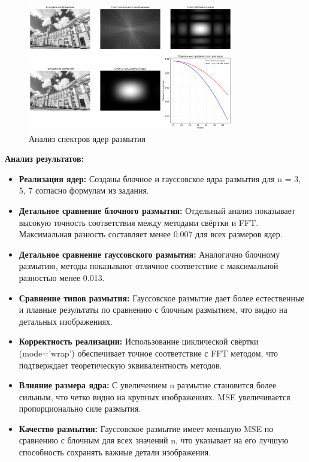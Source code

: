 \begin{figure}[H]
    \centering
    \includegraphics[width=0.8\textwidth]{images/task2/spectrum_analysis.png}
    \caption{Анализ спектров ядер размытия}
    \label{fig:spectrum_analysis_blur}
\end{figure}

\textbf{Анализ результатов:}
\begin{itemize}
    \item \textbf{Реализация ядер:} Созданы блочное и гауссовское ядра размытия для n = 3, 5, 7 согласно формулам из задания.
    
    \item \textbf{Детальное сравнение блочного размытия:} Отдельный анализ показывает высокую точность соответствия между методами свёртки и FFT. Максимальная разность составляет менее 0.007 для всех размеров ядер.
    
    \item \textbf{Детальное сравнение гауссовского размытия:} Аналогично блочному размытию, методы показывают отличное соответствие с максимальной разностью менее 0.013.
    
    \item \textbf{Сравнение типов размытия:} Гауссовское размытие дает более естественные и плавные результаты по сравнению с блочным размытием, что видно на детальных изображениях.
    
    \item \textbf{Корректность реализации:} Использование циклической свёртки (mode='wrap') обеспечивает точное соответствие с FFT методом, что подтверждает теоретическую эквивалентность методов.
    
    \item \textbf{Влияние размера ядра:} С увеличением n размытие становится более сильным, что четко видно на крупных изображениях. MSE увеличивается пропорционально силе размытия.
    
    \item \textbf{Качество размытия:} Гауссовское размытие имеет меньшую MSE по сравнению с блочным для всех значений n, что указывает на его лучшую способность сохранять важные детали изображения.
\end{itemize}

